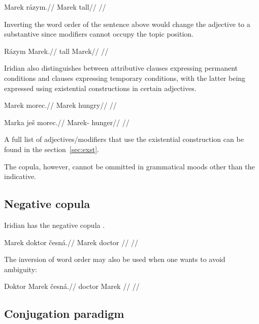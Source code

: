 \pex
\begingl
\gla Marek rázym.//
\glb Marek tall//
\glft {}//
\endgl
\xe

Inverting the word order of the sentence above would change the adjective to a substantive since modifiers cannot occupy the topic position.

\pex
\begingl
\gla Rázym Marek.//
\glb tall Marek//
\glft {}//
\endgl
\xe

Iridian also distinguishes between attributive clauses expressing permanent conditions and clauses expressing temporary conditions, with the latter being expressed using existential constructions in certain adjectives.

\pex
\begingl
\gla *Marek morec.//
\glb Marek hungry//
\glft {}//
\endgl
\xe


\pex
\begingl
\gla Marka je\v{s} morec.//
\glb Marek-  hunger//
\glft {}//
\endgl
\xe

A full list of adjectives/modifiers that use the existential construction can be found in the section~\ref{sec:exst}.

The copula, however, cannot be ommitted in grammatical moods other than the indicative.

\subsection{Negative copula}

Iridian has the negative copula .

\pex
\begingl
\gla Marek doktor \v{c}esná.//
\glb Marek doctor //
\glft {}//
\endgl
\xe

\par The inversion of word order may also be used when one wants to avoid ambiguity:

\pex
\begingl
\gla Doktor Marek \v{c}esná.//
\glb doctor Marek //
\glft {}//
\endgl
\xe


\subsection{Conjugation paradigm}
